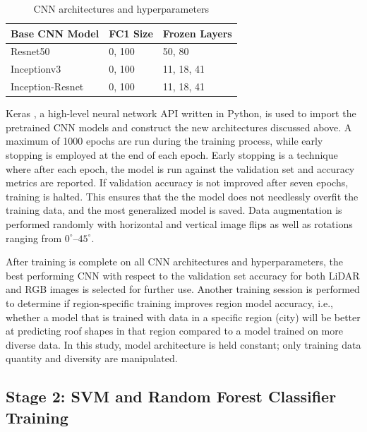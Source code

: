 \begin{table}[H]
\caption{CNN architectures and hyperparameters}\label{table:cnn_arch}
\centering
\begin{tabular}{@{}lll@{}}
\toprule
\textbf{Base CNN Model} & \textbf{FC1 Size}  & \textbf{Frozen Layers} \\ \midrule
Resnet50          & 0, 100 & 50, 80        \\
Inceptionv3       & 0, 100 & 11, 18, 41        \\ 
Inception-Resnet  & 0, 100 & 11, 18, 41        \\\bottomrule
\end{tabular}
\end{table}


Keras \cite{chollet_keras_2015}, a high-level neural network API written in Python, is used to import the pretrained \ac{CNN} models and construct the new architectures discussed above. A maximum of 1000 epochs are run during the training process, while early stopping is employed at the end of each epoch. Early stopping is a technique where after each epoch, the model is run against the validation set and accuracy metrics are reported. If validation accuracy is not improved after seven epochs, training is halted. This ensures that the the model does not needlessly overfit the training data, and the most generalized model is saved. Data augmentation is performed randomly with horizontal and vertical image flips as well as rotations ranging from $0^{\circ}$--$45^{\circ}$.

After training is complete on all CNN architectures and hyperparameters, the best performing \ac{CNN} with respect to the validation set accuracy for both LiDAR and RGB images is selected for further use. Another training session is performed to determine if region-specific training improves region model accuracy, i.e., whether a model that is trained with data in a specific region (city) will be better at predicting roof shapes in that region compared to a model trained on more diverse data. In this study, model architecture is held constant; only training data quantity and diversity are manipulated.


\subsection{Stage 2: SVM and Random Forest Classifier Training} \label{section:rf_stage_two}

